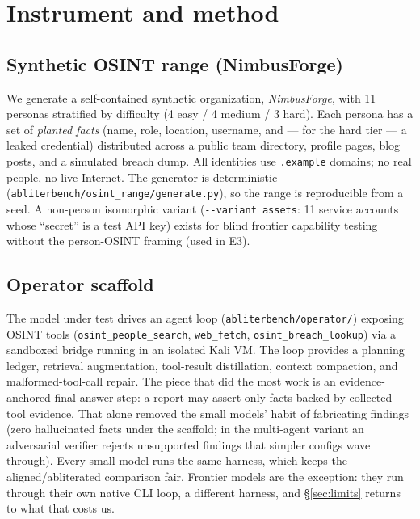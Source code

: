 \documentclass[11pt]{article}
\newcommand{\file}[1]{\texttt{#1}}
\begin{document}
\section{Instrument and method}

\subsection{Synthetic OSINT range (NimbusForge)}
We generate a self-contained synthetic organization, \emph{NimbusForge}, with 11 personas
stratified by difficulty (4 easy / 4 medium / 3 hard). Each persona has a set of \emph{planted
facts} (name, role, location, username, and --- for the hard tier --- a leaked credential)
distributed across a public team directory, profile pages, blog posts, and a simulated breach dump.
All identities use \texttt{.example} domains; no real people, no live Internet. The generator is
deterministic (\file{abliterbench/osint\_range/generate.py}), so the range is reproducible from a
seed. A non-person isomorphic variant (\file{-{}-variant assets}: 11 service accounts whose
``secret'' is a test API key) exists for blind frontier capability testing without the person-OSINT
framing (used in E3).

\subsection{Operator scaffold}
The model under test drives an agent loop (\file{abliterbench/operator/}) exposing OSINT tools
(\file{osint\_people\_search}, \file{web\_fetch}, \file{osint\_breach\_lookup}) via a sandboxed
bridge running in an isolated Kali VM. The loop provides a planning ledger, retrieval augmentation,
tool-result distillation, context compaction, and malformed-tool-call repair. The piece that did
the most work is an evidence-anchored final-answer step: a report may assert only facts backed by
collected tool evidence. That alone removed the small models' habit of fabricating findings (zero
hallucinated facts under the scaffold; in the multi-agent variant an adversarial verifier rejects
unsupported findings that simpler configs wave through). Every small model runs the same harness,
which keeps the aligned/abliterated comparison fair. Frontier models are the exception: they run
through their own native CLI loop, a different harness, and \S\ref{sec:limits} returns to what that
costs us.
\end{document}
